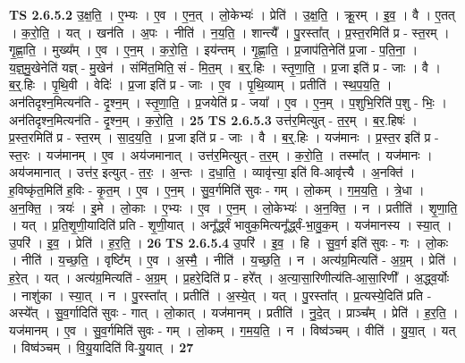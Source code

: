 \documentclass[17pt]{extarticle}
\begin{document}
                  \newline
                                \textbf{ TS 2.6.5.2} \newline
                  उ॒क्ष॒ति॒ । ए॒भ्यः । ए॒व । ए॒न॒त् । लो॒केभ्यः॑ । प्रेति॑ । उ॒क्ष॒ति॒ । क्रू॒रम् । इ॒व॒ । वै । ए॒तत् । क॒रो॒ति॒ । यत् । खन॑ति । अ॒पः । नीति॑ । न॒य॒ति॒ । शान्त्यै᳚ । पु॒रस्ता᳚त् । प्र॒स्त॒रमिति॑ प्र - स्त॒रम् । गृ॒ह्णा॒ति॒ । मुख्य᳚म् । ए॒व । ए॒न॒म् । क॒रो॒ति॒ । इय॑न्तम् । गृ॒ह्णा॒ति॒ । प्र॒जाप॑ति॒नेति॑ प्र॒जा - प॒ति॒ना॒ । य॒ज्ञ्॒मु॒खेनेति॑ यज्ञ् - मु॒खेन॑ । संमि॑त॒मिति॒ सं - मि॒त॒म् । ब॒र्॒.हिः । स्तृ॒णा॒ति॒ । प्र॒जा इति॑ प्र - जाः । वै । ब॒र्॒.हिः । पृ॒थि॒वी । वेदिः॑ । प्र॒जा इति॑ प्र - जाः । ए॒व । पृ॒थि॒व्याम् । प्रतीति॑ । स्थ॒प॒य॒ति॒ । अन॑तिदृश्न॒मित्यन॑ति - दृ॒श्न॒म् । स्तृ॒णा॒ति॒ । प्र॒जयेति॑ प्र - जया᳚ । ए॒व । ए॒न॒म् । प॒शुभि॒रिति॑ प॒शु - भिः॒ । अन॑तिदृश्न॒मित्यन॑ति - दृ॒श्न॒म् । क॒रो॒ति॒ । \textbf{  25} \newline
                  \newline
                                \textbf{ TS 2.6.5.3} \newline
                  उत्त॑र॒मित्युत् - त॒र॒म् । ब॒र॒.हिषः॑ । प्र॒स्त॒रमिति॑ प्र - स्त॒रम् । सा॒द॒य॒ति॒ । प्र॒जा इति॑ प्र - जाः । वै । ब॒र्॒.हिः । यज॑मानः । प्र॒स्त॒र इति॑ प्र - स्त॒रः । यज॑मानम् । ए॒व । अय॑जमानात् । उत्त॑र॒मित्युत् - त॒र॒म् । क॒रो॒ति॒ । तस्मा᳚त् । यज॑मानः । अय॑जमानात् । उत्त॑र॒ इत्युत् - त॒रः॒ । अ॒न्तः । द॒धा॒ति॒ । व्यावृ॑त्त्या॒ इति॑ वि-आवृ॑त्त्यै । अ॒नक्ति॑ । ह॒विष्कृ॑त॒मिति॑ ह॒विः - कृ॒त॒म् । ए॒व । ए॒न॒म् । सु॒व॒र्गमिति॑ सुवः - गम् । लो॒कम् । ग॒म॒य॒ति॒ । त्रे॒धा । अ॒न॒क्ति॒ । त्रयः॑ । इ॒मे । लो॒काः । ए॒भ्यः । ए॒व । ए॒न॒म् । लो॒केभ्यः॑ । अ॒न॒क्ति॒ । न । प्रतीति॑ । शृ॒णा॒ति॒ । यत् । प्र॒ति॒शृ॒णी॒यादिति॑ प्रति - शृ॒णी॒यात् । अनू᳚र्द्ध्वं भावुक॒मित्यनू᳚र्द्ध्वं-भा॒वु॒क॒म् । यज॑मानस्य । स्या॒त् । उ॒परि॑ । इ॒व॒ । प्रेति॑ । ह॒र॒ति॒ । \textbf{  26} \newline
                  \newline
                                \textbf{ TS 2.6.5.4} \newline
                  उ॒परि॑ । इ॒व॒ । हि । सु॒व॒र्ग इति॑ सुवः - गः । लो॒कः । नीति॑ । य॒च्छ॒ति॒ । वृष्टि᳚म् । ए॒व । अ॒स्मै॒ । नीति॑ । य॒च्छ॒ति॒ । न । अत्य॑ग्र॒मित्यति॑ - अ॒ग्र॒म् । प्रेति॑ । ह॒रे॒त् । यत् । अत्य॑ग्र॒मित्यति॑ - अ॒ग्र॒म् । प्र॒हरे॒दिति॑ प्र - हरे᳚त् । अ॒त्या॒सा॒रिणीत्य॑ति-आ॒सा॒रिणी᳚ । अ॒द्ध्व॒र्योः । नाशु॑का । स्या॒त् । न । पु॒रस्ता᳚त् । प्रतीति॑ । अ॒स्ये॒त् । यत् । पु॒रस्ता᳚त् । प्र॒त्यस्ये॒दिति॑ प्रति - अस्ये᳚त् । सु॒व॒र्गादिति॑ सुवः - गात् । लो॒कात् । यज॑मानम् । प्रतीति॑ । नु॒दे॒त् । प्राञ्च᳚म् । प्रेति॑ । ह॒र॒ति॒ । यज॑मानम् । ए॒व । सु॒व॒र्गमिति॑ सुवः - गम् । लो॒कम् । ग॒म॒य॒ति॒ । न । विष्व॑ञ्चम् । वीति॑ । यु॒या॒त् । यत् । विष्व॑ञ्चम् । वि॒यु॒यादिति॑ वि-यु॒यात् । \textbf{  27} \newline
\end{document}
